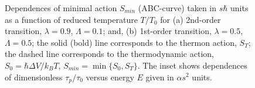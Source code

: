 \documentclass[aps, pre, preprint, groupedaddress, superscriptaddress, showkeys, showpacs] {revtex4-1}
\begin{document}
%
\begin{figure}[ht]
\begin{minipage}[h]{0.49\linewidth}
\end{minipage}
\hfill
\begin{minipage}[h]{0.49\linewidth}
\end{minipage}
\caption{Dependences of  minimal action $S_{min}$ (ABC-curve) taken in $s\hbar$ units as a function of reduced temperature $ T/T_{0}$ for (a) 2nd-order transition, $\lambda = 0.9$, $\Lambda = 0.1$; and, (b) 1st-order transition, $\lambda = 0.5$, $\Lambda = 0.5$; the solid (bold) line corresponds to the thermon action, $S_T$; the dashed line corresponds to the thermodynamic action, $S_0 = \hbar \Delta V / k_B T$, $S_{min} = \min \{S_0, S_T\}$. The inset shows dependences of  dimensionless $\tau_p / \tau_0$ versus energy $E$ given in  $\alpha s^2$ units. 
\label{pic:action_period}}
\end{figure}
%
\end{document}
